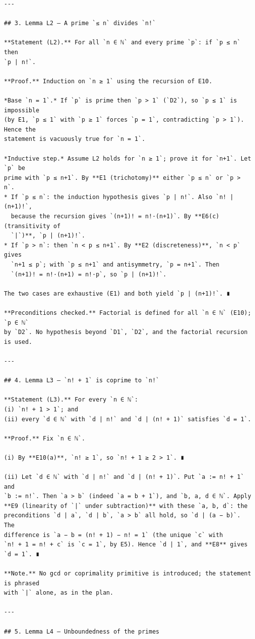 \documentclass[11pt]{article}
\begin{document}
\begin{verbatim}
---

## 3. Lemma L2 — A prime `≤ n` divides `n!`

**Statement (L2).** For all `n ∈ ℕ` and every prime `p`: if `p ≤ n` then
`p | n!`.

**Proof.** Induction on `n ≥ 1` using the recursion of E10.

*Base `n = 1`.* If `p` is prime then `p > 1` (`D2`), so `p ≤ 1` is impossible
(by E1, `p ≤ 1` with `p ≥ 1` forces `p = 1`, contradicting `p > 1`). Hence the
statement is vacuously true for `n = 1`.

*Inductive step.* Assume L2 holds for `n ≥ 1`; prove it for `n+1`. Let `p` be
prime with `p ≤ n+1`. By **E1 (trichotomy)** either `p ≤ n` or `p > n`.
* If `p ≤ n`: the induction hypothesis gives `p | n!`. Also `n! | (n+1)!`,
  because the recursion gives `(n+1)! = n!·(n+1)`. By **E6(c) (transitivity of
  `|`)**, `p | (n+1)!`.
* If `p > n`: then `n < p ≤ n+1`. By **E2 (discreteness)**, `n < p` gives
  `n+1 ≤ p`; with `p ≤ n+1` and antisymmetry, `p = n+1`. Then
  `(n+1)! = n!·(n+1) = n!·p`, so `p | (n+1)!`.

The two cases are exhaustive (E1) and both yield `p | (n+1)!`. ∎

**Preconditions checked.** Factorial is defined for all `n ∈ ℕ` (E10); `p ∈ ℕ`
by `D2`. No hypothesis beyond `D1`, `D2`, and the factorial recursion is used.

---

## 4. Lemma L3 — `n! + 1` is coprime to `n!`

**Statement (L3).** For every `n ∈ ℕ`:
(i) `n! + 1 > 1`; and
(ii) every `d ∈ ℕ` with `d | n!` and `d | (n! + 1)` satisfies `d = 1`.

**Proof.** Fix `n ∈ ℕ`.

(i) By **E10(a)**, `n! ≥ 1`, so `n! + 1 ≥ 2 > 1`. ∎

(ii) Let `d ∈ ℕ` with `d | n!` and `d | (n! + 1)`. Put `a := n! + 1` and
`b := n!`. Then `a > b` (indeed `a = b + 1`), and `b, a, d ∈ ℕ`. Apply
**E9 (linearity of `|` under subtraction)** with these `a, b, d`: the
preconditions `d | a`, `d | b`, `a > b` all hold, so `d | (a − b)`. The
difference is `a − b = (n! + 1) − n! = 1` (the unique `c` with
`n! + 1 = n! + c` is `c = 1`, by E5). Hence `d | 1`, and **E8** gives `d = 1`. ∎

**Note.** No gcd or coprimality primitive is introduced; the statement is phrased
with `|` alone, as in the plan.

---

## 5. Lemma L4 — Unboundedness of the primes


\end{verbatim}
\end{document}
